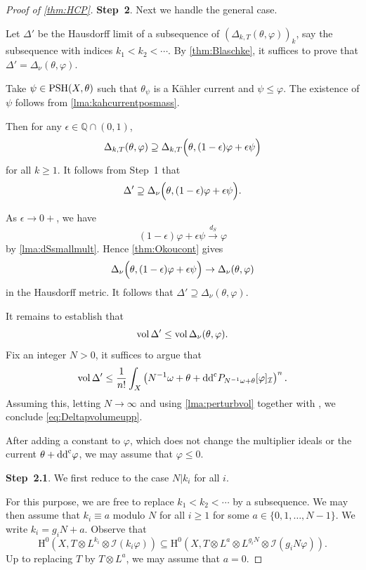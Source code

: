 \begin{proof}[Proof of \cref{thm:HCP}]
\textbf{Step~2}. Next we handle the general case.

Let $\Delta'$ be the Hausdorff limit of a subsequence of $(\Delta_{k,T}(\theta,\varphi))_k$, say the subsequence with indices $k_1<k_2<\cdots$.
By \cref{thm:Blaschke}, it suffices to prove that $\Delta'=\Delta_{\nu}(\theta,\varphi)$.

Take $\psi\in \mathrm{PSH}(X,\theta)$ such that $\theta_{\psi}$ is a Kähler current and $\psi\leq \varphi$. The existence of $\psi$ follows from \cref{lma:kahcurrentposmass}.

    Then for any $\epsilon\in \mathbb{Q}\cap (0,1)$,
    \[
        \Delta_{k,T}(\theta,\varphi)\supseteq \Delta_{k,T}\Bigl(\theta,(1-\epsilon)\varphi+\epsilon\psi \Bigr)
    \]
    for all $k\geq 1$. It follows from Step~1 that
    \[
        \Delta' \supseteq \Delta_{\nu}\Bigl(\theta,(1-\epsilon)\varphi+\epsilon\psi\Bigr).
    \]

    As $\epsilon\to 0+$, we have
    \[
        (1-\epsilon)\varphi+\epsilon\psi\xrightarrow{d_S}\varphi
    \]
    by \cref{lma:dSsmallmult}. Hence \cref{thm:Okoucont} gives
    \[
        \Delta_{\nu}\Bigl(\theta,(1-\epsilon)\varphi+\epsilon\psi\Bigr)\to\Delta_{\nu}(\theta,\varphi)
    \]
    in the Hausdorff metric. It follows that $\Delta' \supseteq \Delta_{\nu}(\theta,\varphi)$.

    It remains to establish that
    \begin{equation}\label{eq:Deltapvolumeupp}
        \operatorname{vol} \Delta'\leq \operatorname{vol} \Delta_{\nu}(\theta,\varphi).
    \end{equation}
    Fix an integer $N>0$, it suffices to argue that
    \begin{equation}\label{eq:Deltapvolumeupp2}
        \operatorname{vol} \Delta'\leq \frac{1}{n!} \int_X \left(N^{-1}\omega+\theta+\mathrm{dd}^{\mathrm{c}} P_{N^{-1}\omega+\theta}[\varphi]_{\mathcal{I}}\right)^n.
    \end{equation}
    Assuming this, letting $N\to\infty$ and using \cref{lma:perturbvol} together with , we conclude \eqref{eq:Deltapvolumeupp}.

    After adding a constant to $\varphi$, which does not change the multiplier ideals or the current $\theta+\mathrm{dd}^{\mathrm{c}}\varphi$, we may assume that $\varphi\leq 0$.

    \textbf{Step~2.1}. We first reduce to the case $N|k_i$ for all $i$.

    For this purpose, we are free to replace $k_1<k_2<\cdots$ by a subsequence. We may then assume that $k_i\equiv a$ modulo $N$ for all $i\geq 1$ for some $a\in \{0,1,\ldots,N-1\}$. We write $k_i=g_iN +a$. Observe that
    \[
        \mathrm{H}^0\left(X,T\otimes L^{k_i}\otimes \mathcal{I}(k_i \varphi)\right)\subseteq \mathrm{H}^0\left(X, T\otimes L^a \otimes L^{g_i N}\otimes \mathcal{I}(g_i N \varphi) \right).
    \]
    Up to replacing $T$ by $T\otimes L^a$, we may assume that $a=0$.


\end{proof}

